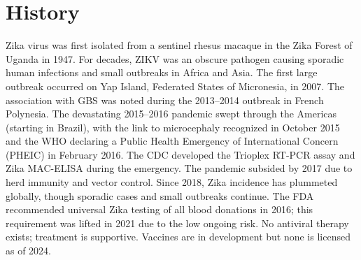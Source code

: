 \section*{History}
Zika virus was first isolated from a sentinel rhesus macaque in the Zika Forest of Uganda in 1947. For decades, ZIKV was an obscure pathogen causing sporadic human infections and small outbreaks in Africa and Asia. The first large outbreak occurred on Yap Island, Federated States of Micronesia, in 2007. The association with GBS was noted during the 2013--2014 outbreak in French Polynesia. The devastating 2015--2016 pandemic swept through the Americas (starting in Brazil), with the link to microcephaly recognized in October 2015 and the WHO declaring a Public Health Emergency of International Concern (PHEIC) in February 2016. The CDC developed the Trioplex RT-PCR assay and Zika MAC-ELISA during the emergency. The pandemic subsided by 2017 due to herd immunity and vector control. Since 2018, Zika incidence has plummeted globally, though sporadic cases and small outbreaks continue. The FDA recommended universal Zika testing of all blood donations in 2016; this requirement was lifted in 2021 due to the low ongoing risk. No antiviral therapy exists; treatment is supportive. Vaccines are in development but none is licensed as of 2024.

